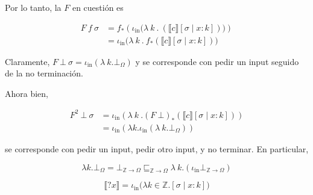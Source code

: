 \documentclass[article, 12pt]{article}
\begin{document}
Por lo tanto, la $F$ en cuestión es

\begin{align*}
  F ~ f ~ \sigma 
  &= f_* \left( \iota_{\text{in}} \big( \lambda ~k~.~\left(
  \llbracket c \rrbracket[\sigma \mid x : k] \right)  \big) \right) \\ 
  &=\iota_{\text{in}}\Big( \lambda ~ k ~ . ~ f_* \left( \llbracket c
  \rrbracket[\sigma \mid x : k] \right)  \Big)
\end{align*}

Claramente, $F ~ \bot ~ \sigma = \iota_{\text{in}}(\lambda ~ k . \bot_\Omega ) 
$ y se corresponde con pedir un input seguido de la no terminación.

Ahora bien,


\begin{align*}
  F^2 ~ \bot ~ \sigma 
  &= \iota_{\text{in}}\left( \lambda ~ k ~ . (F~\bot)_*(\llbracket c
  \rrbracket[\sigma \mid x : k]) \right)  \\ 
  &= \iota_{\text{in}} \left( \lambda k . \iota_{\text{in}}(\lambda ~k.\bot_\Omega)\right)
\end{align*}

se corresponde con pedir un input, pedir otro input, y no terminar. En
particular, 

\begin{equation*}
  \lambda k.\bot_\Omega = \bot_{\mathbb{Z} \to \Omega}
  \sqsubseteq_{\mathbb{Z}\to \Omega} \lambda ~k.(\iota_{\text{in}}
  \bot_{\mathbb{Z}\to \Omega})
\end{equation*}


\pagebreak 

\begin{equation*}
  \llbracket ?x \rrbracket = \iota_{\text{in}} \Big( \lambda k \in
  \mathbb{Z}.[\sigma \mid x : k] \Big)
\end{equation*}
\end{document}
